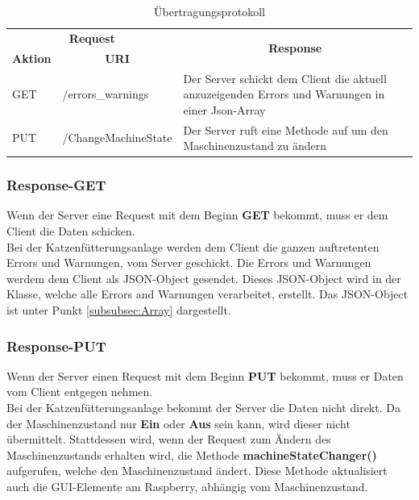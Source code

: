 \begin{table}[htb]
\centering
\begin{tabular}{|l|l|p{290pt}|}
\hline
\multicolumn{2}{|c|}{\textbf{Request}}                                    & \multicolumn{1}{c|}{\multirow{2}{*}{\textbf{Response}}}                                          \\ \cline{1-2}
\multicolumn{1}{|c|}{\textbf{Aktion}} & \multicolumn{1}{c|}{\textbf{\ac{URI}}} & \multicolumn{1}{c|}{}                                                                            \\ \hline
GET                                   & /errors\_warnings                 & Der Server schickt dem Client die aktuell anzuzeigenden Errors und Warnungen in einer Json-Array \\ \hline
PUT                                   & /ChangeMachineState               & Der Server ruft eine Methode auf um den Maschinenzustand zu ändern                               \\ \hline
\end{tabular}
\caption{Übertragungsprotokoll}
\label{Übertragungsprotokoll}
\end{table}

\subsubsection{Response-GET}
Wenn der Server eine Request mit dem Beginn \textbf{GET} bekommt, muss er dem Client die Daten schicken. 
\\ Bei der Katzenfütterungsanlage werden dem Client die ganzen auftretenten Errors und Warnungen, vom Server geschickt. Die Errors und Warnungen werdem dem Client als \ac{JSON}-Object gesendet. Dieses \ac{JSON}-Object wird in der Klasse, welche alle Errors and Warnungen verarbeitet, erstellt. Das \ac{JSON}-Object ist unter Punkt \ref{subsubsec:Array} dargestellt. 

\subsubsection{Response-PUT}
Wenn der Server einen Request mit dem Beginn \textbf{PUT} bekommt, muss er Daten vom Client entgegen nehmen.
\\ Bei der Katzenfütterungsanlage bekommt der Server die Daten nicht direkt. Da der Maschinenzustand nur \textbf{Ein} oder \textbf{Aus} sein kann, wird dieser nicht übermittelt. Stattdessen wird, wenn der Request zum Ändern des Maschinenzustands erhalten wird, die Methode \textbf{machineStateChanger()} aufgerufen, welche den Maschinenzustand ändert. Diese Methode aktualisiert auch die \ac{GUI}-Elemente am Raspberry, abhängig vom Maschinenzustand. 


